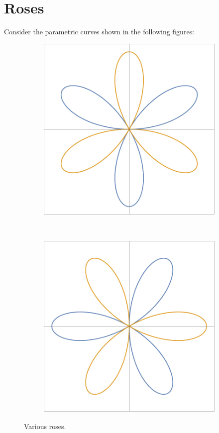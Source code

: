 \documentclass[12pt]{article}
\begin{document}
	\section*{Roses}
	Consider the parametric curves shown in the following figures:
	\begin{figure}[h!]
		\centering
		\begin{subfigure}[t]{0.5\textwidth}
			\centering
			\includegraphics[scale=0.5125]{7_Roses}
			\caption{}
			\label{subfig:roses1}
		\end{subfigure}%
		~ 
		\begin{subfigure}[t]{0.5\textwidth}
			\centering
			\includegraphics[scale=0.5125]{7_Roses2}
			\caption{}
			\label{subfig:roses2}
		\end{subfigure}
		\caption{Various roses.}
		\label{fig:roses}
	\end{figure}
\end{document}
